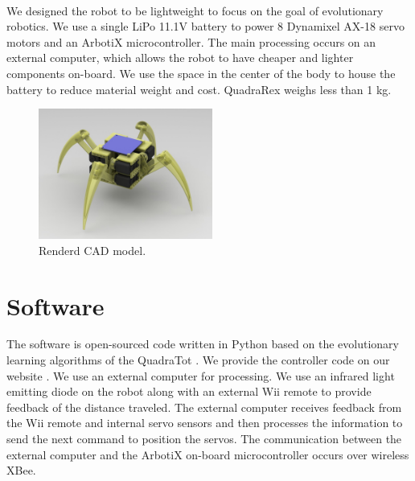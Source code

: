 \documentclass[letterpaper]{article}
\begin{document}
\\
We designed the robot to be lightweight to focus on the goal of evolutionary robotics. We use a single LiPo 11.1V battery to power 8 Dynamixel AX-18 servo motors and an ArbotiX microcontroller. The main processing occurs on an external computer, which allows the robot to have cheaper and lighter components on-board. We use the space in the center of the body to house the battery to reduce material weight and cost. QuadraRex weighs less than 1 kg.
\begin{figure}[t]
\begin{center}
\includegraphics[width=2.25in,angle=0]{fig5.jpg}
\caption{Renderd CAD model.}
\label{fi52}
\end{center}
\end{figure}

\section{Software}
The software is open-sourced code written in Python based on the evolutionary learning algorithms of the QuadraTot \citep{JY}. We provide the controller code on our website \citep{WEB}. We use an external computer for processing. We use an infrared light emitting diode on the robot along with an external Wii remote to provide feedback of the distance traveled. The external computer receives feedback from the Wii remote and internal servo sensors and then processes the information to send the next command to position the servos. The communication between the external computer and the ArbotiX on-board microcontroller occurs over wireless XBee.
\end{document}
